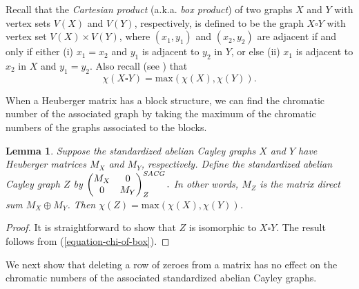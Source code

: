 \documentclass{article}
\newtheorem{Lem}[Thm]{Lemma}
\theoremstyle{definition}
\theoremstyle{remark}
\begin{document}

\vspace{.1in}

Recall that the \emph{Cartesian product} (a.k.a. \emph{box product}) of two graphs $X$ and $Y$ with vertex sets $V(X)$ and $V(Y)$, respectively, is defined to be the graph $X\square Y$ with vertex set $V(X)\times V(Y)$, where $(x_1,y_1)$ and $(x_2,y_2)$ are adjacent if and only if either (i) $x_1=x_2$ and $y_1$ is adjacent to $y_2$ in $Y$, or else (ii) $x_1$ is adjacent to $x_2$ in $X$ and $y_1=y_2$.  Also recall (see \cite{Sabidussi}) that\begin{equation}\label{equation-chi-of-box} \chi(X\square Y)=\text{max}(\chi(X),\chi(Y)).\end{equation}

When a Heuberger matrix has a block structure, we can find the chromatic number of the associated graph by taking the maximum of the chromatic numbers of the graphs associated to the blocks.

\begin{Lem}\label{lemma-block-structure}
Suppose the standardized abelian Cayley graphs $X$ and $Y$ have Heuberger matrices $M_X$ and $M_Y$, respectively.  Define the standardized abelian Cayley graph $Z$ by \(\begin{pmatrix}M_X & 0\\
0 & M_Y\end{pmatrix}^{\emph{SACG}}_{Z}.\)  In other words, $M_Z$ is the matrix direct sum $M_X\oplus M_Y$.  Then $\chi(Z)=\text{max}(\chi(X),\chi(Y))$.\end{Lem}\begin{proof}
It is straightforward to show that $Z$ is isomorphic to $X\square Y$.  The result follows from (\ref{equation-chi-of-box}).\end{proof}

We next show that deleting a row of zeroes from a matrix has no effect on the chromatic numbers of the associated standardized abelian Cayley graphs.
\end{document}
